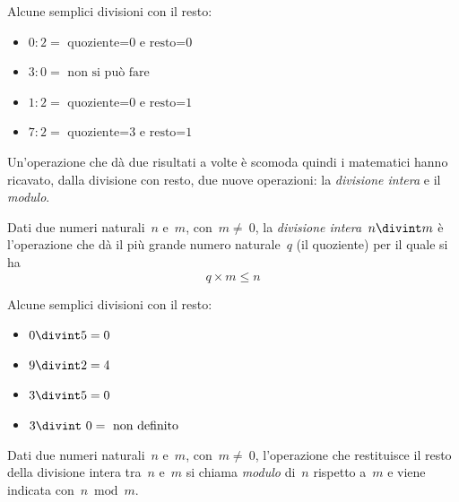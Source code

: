  \begin{esempio}
 Alcune semplici divisioni con il resto:
 \vspace{-1em}
\begin{multicols}{2}
\begin{itemize} [nosep]
\item \(0:2 = \text{ quoziente=0 e resto=0}\)
\item \(3:0 = \text{ non si può fare}\)
\item \(1:2 = \text{ quoziente=0 e resto=1}\)
\item \(7:2 = \text{ quoziente=3 e resto=1}\)
\end{itemize}
\end{multicols}
\end{esempio}

Un'operazione che dà due risultati a volte è scomoda quindi i matematici 
hanno ricavato, dalla divisione con resto, due nuove operazioni: 
la \emph{divisione intera} e il \emph{modulo}.

\begin{definizione}
 Dati due numeri naturali~\(n\) e~\(m\), con~\(m\neq~0\), la 
 \emph{divisione intera}~\(n\divint m\) è l'operazione che dà il più grande 
 numero naturale~\(q\) (il quoziente) per il quale si ha
\[q\times m\le n\]
\end{definizione}

 \begin{esempio}
 Alcune semplici divisioni con il resto:
 \vspace{-1em}
\begin{multicols}{2}
\begin{itemize} [nosep]
\item \(0 \divint 5=0\)
\item \(9 \divint 2=4\)
\item \(3\divint 5=0\)
\item \(3\divint~0=\text{ non definito}\)
\end{itemize}
\end{multicols}
\end{esempio}

\begin{definizione}
 Dati due numeri naturali~\(n\) e~\(m\), con~\(m\neq~0\), l'operazione che 
 restituisce il resto della divisione intera tra~\(n\) e~\(m\) si chiama 
 \emph{modulo} di~\(n\) rispetto a~\(m\) e viene indicata con~\(n\bmod{m}\).
\end{definizione}

